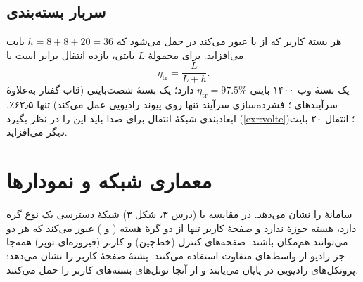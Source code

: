 \documentclass[11pt,a4paper]{article}
\begin{document}
\begin{acnfigure}
  \caption{بودجهٔ نمایشی تأخیر یک‌طرفهٔ صفحهٔ کاربر فروسو بر اساس \cref{eq:latency} ().}
  \label{fig:latency}
\end{acnfigure}

\subsection{سربار بسته‌بندی}\label{sec:overhead}
هر بستهٔ کاربر که از  یا  عبور می‌کند در  حمل می‌شود که
$h = 8 + 8 + 20 = 36$ بایت می‌افزاید. برای محمولهٔ $L$ بایتی، بازده انتقال برابر است با
\begin{equation}\label{eq:eff}
  \eta_{\mathrm{tr}} = \frac{L}{L + h}.
\end{equation}
یک بستهٔ وب ۱۴۰۰ بایتی $\eta_{\mathrm{tr}} = 97.5\%$ دارد؛ یک بستهٔ  شصت‌بایتی (قاب گفتار
به‌علاوهٔ سرآیندهای ؛ فشرده‌سازی سرآیند تنها روی پیوند رادیویی عمل می‌کند) تنها ۶۲٫۵٪.
ابعادبندی شبکهٔ انتقال برای صدا باید این را در نظر بگیرد (\cref{exr:volte})؛ انتقال  ۲۰ بایت دیگر
می‌افزاید.

\section{معماری شبکه و نمودارها}
 سامانهٔ  را نشان می‌دهد. در مقایسه با  (درس ۳، شکل ۳) شبکهٔ دسترسی
یک نوع گره دارد، هسته حوزهٔ  ندارد و صفحهٔ کاربر تنها از دو گرهٔ هسته ( و )
عبور می‌کند که هر دو می‌توانند هم‌مکان باشند. صفحه‌های کنترل (خط‌چین) و کاربر (فیروزه‌ای توپر) همه‌جا
جز رادیو از واسط‌های متفاوت استفاده می‌کنند.  پشتهٔ صفحهٔ کاربر را نشان می‌دهد:
پروتکل‌های رادیویی در  پایان می‌یابند و از آنجا تونل‌های  بسته‌های  کاربر
را حمل می‌کنند.

\begin{acnfigure}
  \caption{سامانهٔ بستهٔ تکامل‌یافته. آبی خط‌چین: صفحهٔ کنترل؛ فیروزه‌ای توپر: صفحهٔ کاربر.}
  \label{fig:arch}
\end{acnfigure}

\begin{acnfigure}
  \caption{پشتهٔ پروتکل صفحهٔ کاربر . بستهٔ   روی رادیو با
   و روی  و  با تونل‌های  حمل می‌شود؛  لنگر  است.}
  \label{fig:stack}
\end{acnfigure}
\end{document}
